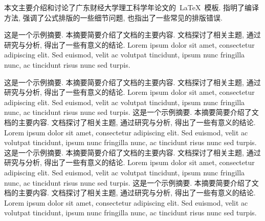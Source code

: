 
\begin{cnabstract}
本文主要介绍和讨论了广东财经大学理工科学年论文的~\LaTeX{}~模板.
指明了编译方法, 强调了公式排版的一些细节问题, 也指出了一些常见的排版错误.\the\baselineskip

这是一个示例摘要.  本摘要简要介绍了文档的主要内容.  文档探讨了相关主题, 通过研究与分析, 得出了一些有意义的结论.  Lorem ipsum dolor sit amet, consectetur adipiscing elit. Sed euismod, velit ac volutpat tincidunt, ipsum nunc fringilla nunc, ac tincidunt risus nunc sed turpis.\the\baselineskip

这是一个示例摘要.  本摘要简要介绍了文档的主要内容.  文档探讨了相关主题, 通过研究与分析, 得出了一些有意义的结论.  Lorem ipsum dolor sit amet, consectetur adipiscing elit. Sed euismod, velit ac volutpat tincidunt, ipsum nunc fringilla nunc, ac tincidunt risus nunc sed turpis.
这是一个示例摘要.  本摘要简要介绍了文档的主要内容.  文档探讨了相关主题, 通过研究与分析, 得出了一些有意义的结论.  Lorem ipsum dolor sit amet, consectetur adipiscing elit. Sed euismod, velit ac volutpat tincidunt, ipsum nunc fringilla nunc, ac tincidunt risus nunc sed turpis.
这是一个示例摘要.  本摘要简要介绍了文档的主要内容.  文档探讨了相关主题, 通过研究与分析, 得出了一些有意义的结论.  Lorem ipsum dolor sit amet, consectetur adipiscing elit. Sed euismod, velit ac volutpat tincidunt, ipsum nunc fringilla nunc, ac tincidunt risus nunc sed turpis.
这是一个示例摘要.  本摘要简要介绍了文档的主要内容.  文档探讨了相关主题, 通过研究与分析, 得出了一些有意义的结论.  Lorem ipsum dolor sit amet, consectetur adipiscing elit. Sed euismod, velit ac volutpat tincidunt, ipsum nunc fringilla nunc, ac tincidunt risus nunc sed turpis.\the\baselineskip

\end{cnabstract}
